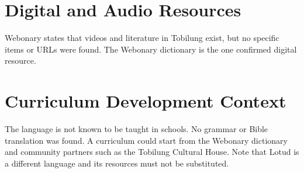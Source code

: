 \documentclass[12pt]{article}
\begin{document}
\section{Digital and Audio Resources}
Webonary states that videos and literature in Tobilung exist, but no specific items or URLs were found. The Webonary dictionary is the one confirmed digital resource.

\section{Curriculum Development Context}
The language is not known to be taught in schools. No grammar or Bible translation was found. A curriculum could start from the Webonary dictionary and community partners such as the Tobilung Cultural House. Note that Lotud is a different language and its resources must not be substituted.
\end{document}
